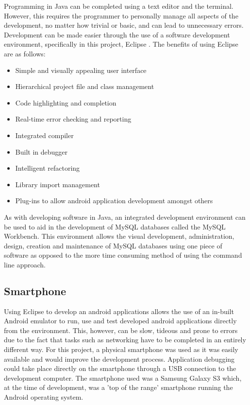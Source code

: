 \documentclass[a4paper,12pt]{report}
\begin{document}
Programming in Java can be completed using a text editor and the terminal. However, this requires the programmer to personally manage all aspects of the development, no matter how trivial or basic, and can lead to unnecessary errors. Development can be made easier through the use of a software development environment, specifically in this project, Eclipse \cite{eclipse}. The benefits of using Eclipse are as follows:

\begin{itemize}
 \item Simple and visually appealing user interface
 \item Hierarchical project file and class management
 \item Code highlighting and completion
 \item Real-time error checking and reporting
 \item Integrated compiler
 \item Built in debugger
 \item Intelligent refactoring
 \item Library import management
 \item Plug-ins to allow android application development amongst others 
\end{itemize}

As with developing software in Java, an integrated development environment can be used to aid in the development of MySQL databases called the MySQL Workbench. This environment allows the visual development, administration, design, creation and maintenance of MySQL databases using one piece of software as opposed to the more time consuming method of using the command line approach. 

\subsection{Smartphone} 

Using Eclipse to develop an android applications allows the use of an in-built Android emulator to run, use and test developed android applications directly from the environment. This, however, can be slow, tideous and prone to errors due to the fact that tasks such as networking have to be completed in an entirely different way. For this project, a physical smartphone was used as it was easily available and would improve the development process. Application debugging could take place directly on the smartphone through a USB connection to the development computer. The smartphone used was a Samsung Galaxy S3 \cite{sthree} which, at the time of development, was a 'top of the range' smartphone running the Android operating system.
\end{document}
